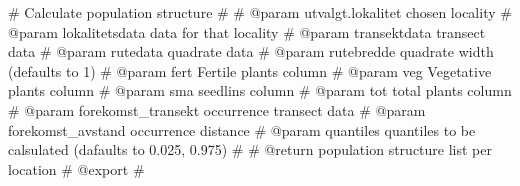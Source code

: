 \documentclass[
  letterpaper,
  DIV=11,
  numbers=noendperiod]{scrreport}
\newenvironment{Shaded}{\begin{snugshade}}{\end{snugshade}}
\newcommand{\CommentTok}[1]{\textcolor[rgb]{0.37,0.37,0.37}{#1}}
\begin{document}
\begin{Shaded}
\begin{Highlighting}[]
\CommentTok{\#\textquotesingle{} Calculate population structure}
\CommentTok{\#\textquotesingle{}}
\CommentTok{\#\textquotesingle{} @param utvalgt.lokalitet chosen locality}
\CommentTok{\#\textquotesingle{} @param lokalitetsdata data for that locality}
\CommentTok{\#\textquotesingle{} @param transektdata transect data }
\CommentTok{\#\textquotesingle{} @param rutedata quadrate data}
\CommentTok{\#\textquotesingle{} @param rutebredde quadrate width (defaults to 1)}
\CommentTok{\#\textquotesingle{} @param fert Fertile plants column}
\CommentTok{\#\textquotesingle{} @param veg Vegetative plants column}
\CommentTok{\#\textquotesingle{} @param sma seedlins column}
\CommentTok{\#\textquotesingle{} @param tot total plants column}
\CommentTok{\#\textquotesingle{} @param forekomst\_transekt occurrence transect data}
\CommentTok{\#\textquotesingle{} @param forekomst\_avstand occurrence distance}
\CommentTok{\#\textquotesingle{} @param quantiles quantiles to be calsulated (dafaults to 0.025, 0.975)}
\CommentTok{\#\textquotesingle{}}
\CommentTok{\#\textquotesingle{} @return population structure list per location}
\CommentTok{\#\textquotesingle{} @export}
\CommentTok{\#\textquotesingle{}}


\end{Highlighting}
\end{Shaded}
\end{document}

